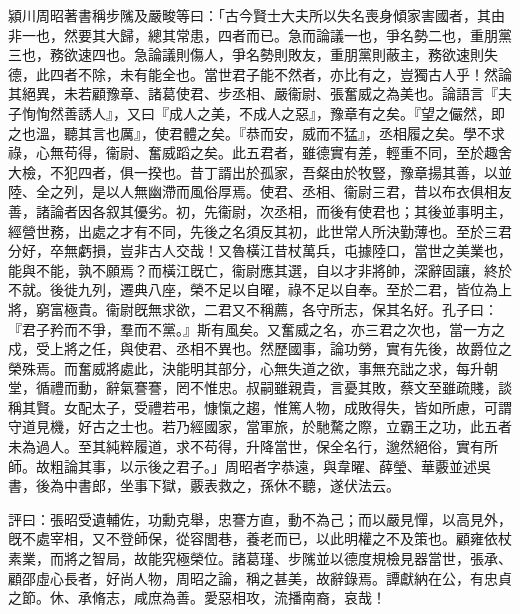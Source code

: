 \begin{pinyinscope}
潁川周昭著書稱步隲及嚴畯等曰：「古今賢士大夫所以失名喪身傾家害國者，其由非一也，然要其大歸，總其常患，四者而已。急而論議一也，爭名勢二也，重朋黨三也，務欲速四也。急論議則傷人，爭名勢則敗友，重朋黨則蔽主，務欲速則失德，此四者不除，未有能全也。當世君子能不然者，亦比有之，豈獨古人乎！然論其絕異，未若顧豫章、諸葛使君、步丞相、嚴衞尉、張奮威之為美也。論語言『夫子恂恂然善誘人』，又曰『成人之美，不成人之惡』，豫章有之矣。『望之儼然，即之也溫，聽其言也厲』，使君體之矣。『恭而安，威而不猛』，丞相履之矣。學不求祿，心無苟得，衞尉、奮威蹈之矣。此五君者，雖德實有差，輕重不同，至於趣舍大檢，不犯四者，俱一揆也。昔丁諝出於孤家，吾粲由於牧豎，豫章揚其善，以並陸、全之列，是以人無幽滯而風俗厚焉。使君、丞相、衞尉三君，昔以布衣俱相友善，諸論者因各叙其優劣。初，先衞尉，次丞相，而後有使君也；其後並事明主，經營世務，出處之才有不同，先後之名須反其初，此世常人所決勤薄也。至於三君分好，卒無虧損，豈非古人交哉！又魯橫江昔杖萬兵，屯據陸口，當世之美業也，能與不能，孰不願焉？而橫江旣亡，衞尉應其選，自以才非將帥，深辭固讓，終於不就。後徙九列，遷典八座，榮不足以自曜，祿不足以自奉。至於二君，皆位為上將，窮富極貴。衞尉旣無求欲，二君又不稱薦，各守所志，保其名好。孔子曰：『君子矜而不爭，羣而不黨。』斯有風矣。又奮威之名，亦三君之次也，當一方之戍，受上將之任，與使君、丞相不異也。然歷國事，論功勞，實有先後，故爵位之榮殊焉。而奮威將處此，決能明其部分，心無失道之欲，事無充詘之求，每升朝堂，循禮而動，辭氣謇謇，罔不惟忠。叔嗣雖親貴，言憂其敗，蔡文至雖疏賤，談稱其賢。女配太子，受禮若弔，慷愾之趨，惟篤人物，成敗得失，皆如所慮，可謂守道見機，好古之士也。若乃經國家，當軍旅，於馳騖之際，立霸王之功，此五者未為過人。至其純粹履道，求不苟得，升降當世，保全名行，邈然絕俗，實有所師。故粗論其事，以示後之君子。」周昭者字恭遠，與韋曜、薛瑩、華覈並述吳書，後為中書郎，坐事下獄，覈表救之，孫休不聽，遂伏法云。

評曰：張昭受遺輔佐，功勳克舉，忠謇方直，動不為己；而以嚴見憚，以高見外，旣不處宰相，又不登師保，從容閭巷，養老而已，以此明權之不及策也。顧雍依杖素業，而將之智局，故能究極榮位。諸葛瑾、步隲並以德度規檢見器當世，張承、顧邵虛心長者，好尚人物，周昭之論，稱之甚美，故辭錄焉。譚獻納在公，有忠貞之節。休、承脩志，咸庶為善。愛惡相攻，流播南裔，哀哉！


\end{pinyinscope}